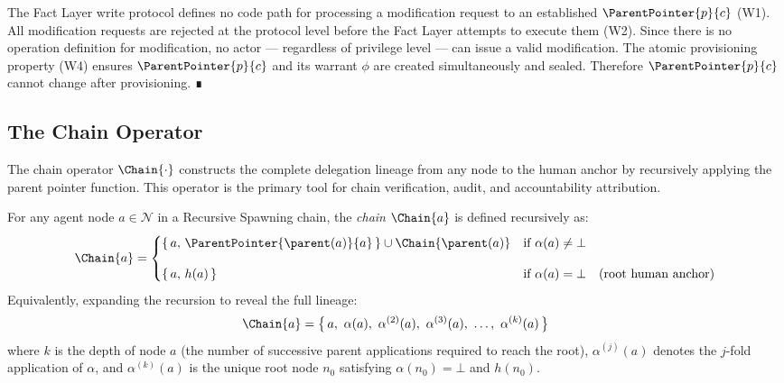 \begin{pf}
The Fact Layer write protocol defines no code path for processing a modification request to an established $\ParentPointer{p}{c}$ (W1). All modification requests are rejected at the protocol level before the Fact Layer attempts to execute them (W2). Since there is no operation definition for modification, no actor --- regardless of privilege level --- can issue a valid modification. The atomic provisioning property (W4) ensures $\ParentPointer{p}{c}$ and its warrant $\phi$ are created simultaneously and sealed. Therefore $\ParentPointer{p}{c}$ cannot change after provisioning. ∎
\end{pf}

\subsection{The Chain Operator}
\label{sec:chain-operator}

The chain operator $\Chain{\cdot}$ constructs the complete delegation lineage from any node to the human anchor by recursively applying the parent pointer function. This operator is the primary tool for chain verification, audit, and accountability attribution.

\begin{dfn}
\label{def:chain-operator}
For any agent node $a \in \mathcal{N}$ in a Recursive Spawning chain, the \emph{chain} $\Chain{a}$ is defined recursively as:
\begin{equation}
\Chain{a} =
\begin{cases}
\{\,a,\,\ParentPointer{\parent(a)}{a}\,\} \cup \Chain{\parent(a)} & \text{if } \alpha(a) \neq \bot \\[10pt]
\{\,a,\,h(a)\,\} & \text{if } \alpha(a) = \bot \quad \text{(root human anchor)}
\end{cases}
\label{eq:chain-recursive}
\end{equation}
Equivalently, expanding the recursion to reveal the full lineage:
\begin{equation}
\Chain{a} = \bigl\{\, a,\ \alpha(a),\ \alpha^{(2)}(a),\ \alpha^{(3)}(a),\ \ldots,\ \alpha^{(k)}(a) \,\bigr\}
\label{eq:chain-expanded}
\end{equation}
where $k$ is the depth of node $a$ (the number of successive parent applications required to reach the root), $\alpha^{(j)}(a)$ denotes the $j$-fold application of $\alpha$, and $\alpha^{(k)}(a)$ is the unique root node $n_0$ satisfying $\alpha(n_0) = \bot$ and $h(n_0)$.
\end{dfn}

